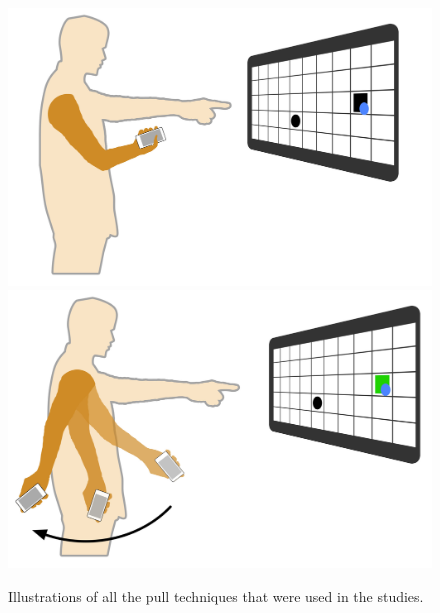\begin{figure}[H]
{	\includegraphics[width = 0.16\columnwidth]{images/techniques/throwPull2.jpg}\label{fig:throwPull2}
	\includegraphics[width = 0.16\columnwidth]{images/techniques/throwPull3.jpg}\label{fig:throwPull3}}
\caption{Illustrations of all the pull techniques that were used in the studies.}
\label{fig:pullTechniques}
\end{figure}